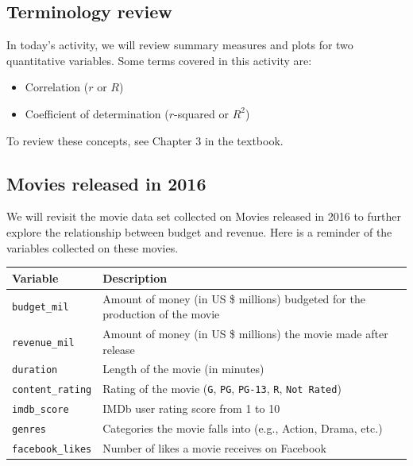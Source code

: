 \documentclass[
]{report}
\begin{document}
\hypertarget{terminology-review-9}{%
\subsection{Terminology review}\label{terminology-review-9}}

In today's activity, we will review summary measures and plots for two quantitative variables. Some terms covered in this activity are:

\begin{itemize}
\item
  Correlation (\(r\) or \(R\))
\item
  Coefficient of determination (\(r\)-squared or \(R^2\))
\end{itemize}

To review these concepts, see Chapter 3 in the textbook.

\hypertarget{movies-released-in-2016-3}{%
\subsection{Movies released in 2016}\label{movies-released-in-2016-3}}

We will revisit the movie data set collected on Movies released in 2016 to further explore the relationship between budget and revenue. Here is a reminder of the variables collected on these movies.

\begin{longtable}[]{@{}
  >{\raggedright\arraybackslash}p{}
  >{\raggedright\arraybackslash}p{}@{}}
\toprule
\textbf{Variable} & \textbf{Description} \\
\midrule
\endhead
\texttt{budget\_mil} & Amount of money (in US \$ millions) budgeted for the production of the movie \\
\texttt{revenue\_mil} & Amount of money (in US \$ millions) the movie made after release \\
\texttt{duration} & Length of the movie (in minutes) \\
\texttt{content\_rating} & Rating of the movie (\texttt{G}, \texttt{PG}, \texttt{PG-13}, \texttt{R}, \texttt{Not\ Rated}) \\
\texttt{imdb\_score} & IMDb user rating score from 1 to 10 \\
\texttt{genres} & Categories the movie falls into (e.g., Action, Drama, etc.) \\
\texttt{facebook\_likes} & Number of likes a movie receives on Facebook \\
\bottomrule
\end{longtable}
\end{document}
